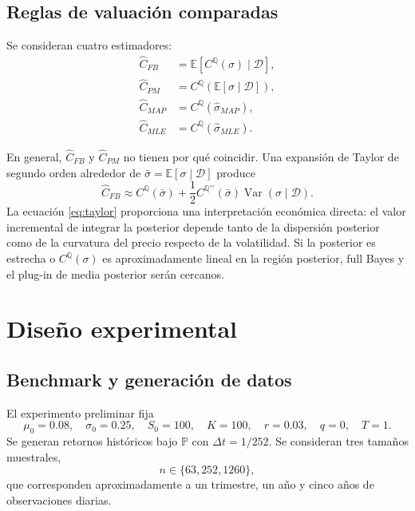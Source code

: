 \documentclass[12pt,letterpaper]{article}
\newcommand{\Pmeasure}{\mathbb{P}}
\newcommand{\Qmeasure}{\mathbb{Q}}
\newcommand{\E}{\mathbb{E}}
\newcommand{\Var}{\operatorname{Var}}
\begin{document}
\subsection{Reglas de valuación comparadas}

Se consideran cuatro estimadores:
\begin{align}
 \widehat C_{FB}
 &=\E\left[C^{\Qmeasure}(\sigma)\mid\mathcal D\right],
 \label{eq:fb}\\
 \widehat C_{PM}
 &=C^{\Qmeasure}\!\left(\E[\sigma\mid\mathcal D]\right),
 \label{eq:pm}\\
 \widehat C_{MAP}
 &=C^{\Qmeasure}(\widehat\sigma_{MAP}),
 \label{eq:map}\\
 \widehat C_{MLE}
 &=C^{\Qmeasure}(\widehat\sigma_{MLE}).
 \label{eq:mle}
\end{align}

En general, $\widehat C_{FB}$ y $\widehat C_{PM}$ no tienen por qué coincidir. Una expansión de Taylor de segundo orden alrededor de $\bar\sigma=\E[\sigma\mid\mathcal D]$ produce
\begin{equation}
 \widehat C_{FB}
 \approx
 C^{\Qmeasure}(\bar\sigma)
 +\frac{1}{2}C^{\Qmeasure\prime\prime}(\bar\sigma)
 \Var(\sigma\mid\mathcal D).
 \label{eq:taylor}
\end{equation}
La ecuación \eqref{eq:taylor} proporciona una interpretación económica directa: el valor incremental de integrar la posterior depende tanto de la dispersión posterior como de la curvatura del precio respecto de la volatilidad. Si la posterior es estrecha o $C^{\Qmeasure}(\sigma)$ es aproximadamente lineal en la región posterior, full Bayes y el plug-in de media posterior serán cercanos.

\section{Diseño experimental}

\subsection{Benchmark y generación de datos}

El experimento preliminar fija
\begin{equation}
 \mu_0=0.08,
 \quad \sigma_0=0.25,
 \quad S_0=100,
 \quad K=100,
 \quad r=0.03,
 \quad q=0,
 \quad T=1.
\end{equation}
Se generan retornos históricos bajo $\Pmeasure$ con $\Delta t=1/252$. Se consideran tres tamaños muestrales,
\begin{equation}
 n\in\{63,252,1260\},
\end{equation}
que corresponden aproximadamente a un trimestre, un año y cinco años de observaciones diarias.
\end{document}
